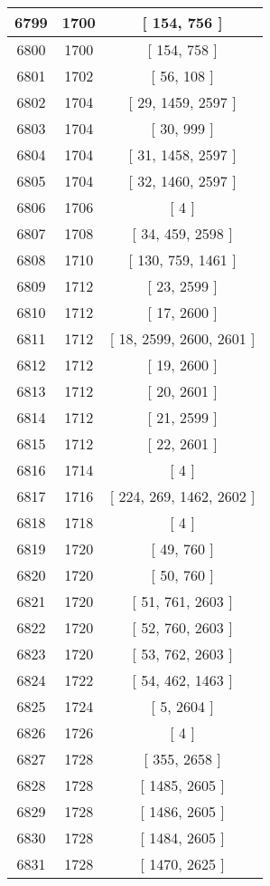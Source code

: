\begin{center}
\begin{longtable}[H]{|| c c c ||}
\hline
6799 & 1700 & [ 154, 756 ] \\ 
\hline
6800 & 1700 & [ 154, 758 ] \\ 
\hline
6801 & 1702 & [ 56, 108 ] \\ 
\hline
6802 & 1704 & [ 29, 1459, 2597 ] \\ 
\hline
6803 & 1704 & [ 30, 999 ] \\ 
\hline
6804 & 1704 & [ 31, 1458, 2597 ] \\ 
\hline
6805 & 1704 & [ 32, 1460, 2597 ] \\ 
\hline
6806 & 1706 & [ 4 ] \\ 
\hline
6807 & 1708 & [ 34, 459, 2598 ] \\ 
\hline
6808 & 1710 & [ 130, 759, 1461 ] \\ 
\hline
6809 & 1712 & [ 23, 2599 ] \\ 
\hline
6810 & 1712 & [ 17, 2600 ] \\ 
\hline
6811 & 1712 & [ 18, 2599, 2600, 2601 ] \\ 
\hline
6812 & 1712 & [ 19, 2600 ] \\ 
\hline
6813 & 1712 & [ 20, 2601 ] \\ 
\hline
6814 & 1712 & [ 21, 2599 ] \\ 
\hline
6815 & 1712 & [ 22, 2601 ] \\ 
\hline
6816 & 1714 & [ 4 ] \\ 
\hline
6817 & 1716 & [ 224, 269, 1462, 2602 ] \\ 
\hline
6818 & 1718 & [ 4 ] \\ 
\hline
6819 & 1720 & [ 49, 760 ] \\ 
\hline
6820 & 1720 & [ 50, 760 ] \\ 
\hline
6821 & 1720 & [ 51, 761, 2603 ] \\ 
\hline
6822 & 1720 & [ 52, 760, 2603 ] \\ 
\hline
6823 & 1720 & [ 53, 762, 2603 ] \\ 
\hline
6824 & 1722 & [ 54, 462, 1463 ] \\ 
\hline
6825 & 1724 & [ 5, 2604 ] \\ 
\hline
6826 & 1726 & [ 4 ] \\ 
\hline
6827 & 1728 & [ 355, 2658 ] \\ 
\hline
6828 & 1728 & [ 1485, 2605 ] \\ 
\hline
6829 & 1728 & [ 1486, 2605 ] \\ 
\hline
6830 & 1728 & [ 1484, 2605 ] \\ 
\hline
6831 & 1728 & [ 1470, 2625 ] \\ 

\end{longtable}
\end{center}
